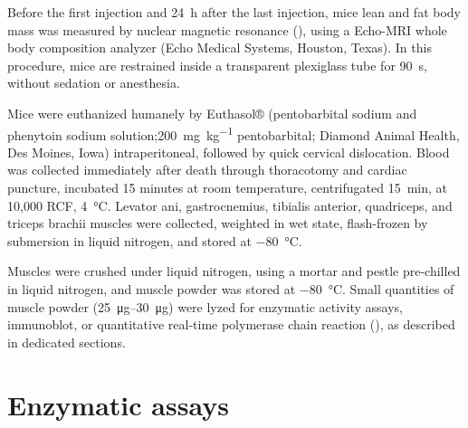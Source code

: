 \documentclass[12pt,english]{report}\usepackage[]{graphicx}\usepackage[]{color}
\begin{document}
Before the first injection and \SI{24}{\hour} after the last injection,
mice lean and fat body mass was measured by nuclear magnetic resonance
(), using a Echo-MRI
whole body composition analyzer (Echo Medical Systems, Houston, Texas).
In this procedure, mice are restrained inside a transparent plexiglass
tube for \SI{90}{\second}, without sedation or anesthesia.

Mice were euthanized humanely by Euthasol® (pentobarbital sodium and
phenytoin sodium solution;\SI{200}{\milli\gram\per\kilo\gram} pentobarbital;
Diamond Animal Health, Des Moines, Iowa) intraperitoneal, followed
by quick cervical dislocation. Blood was collected immediately after
death through thoracotomy and cardiac puncture, incubated 15 minutes
at room temperature, centrifugated \SI{15}{\minute}, at 10,000 RCF,
\SI{4}{\celsius}. Levator ani, gastrocnemius, tibialis anterior,
quadriceps, and triceps brachii muscles were collected, weighted in
wet state, flash-frozen by submersion in liquid nitrogen, and stored
at \SI{-80}{\celsius}.

Muscles were crushed under liquid nitrogen, using a mortar and pestle
pre-chilled in liquid nitrogen, and muscle powder was stored at \SI{-80}{\celsius}.
Small quantities of muscle powder (\SIrange{25}{30}{\micro\gram})
were lyzed for enzymatic activity assays, immunoblot, or quantitative
real-time polymerase chain reaction (),
as described in dedicated sections.


\section{Enzymatic assays}
\end{document}
